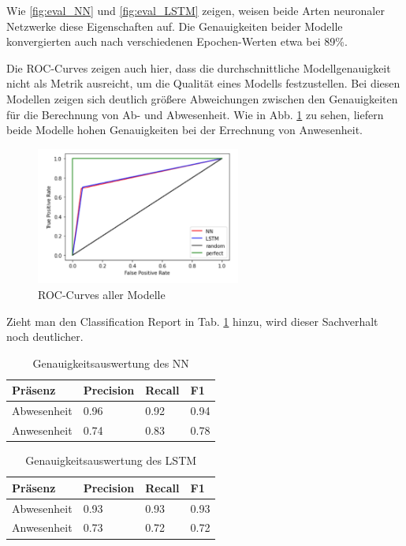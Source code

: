 Wie \ref{fig:eval_NN} und \ref{fig:eval_LSTM} zeigen, weisen beide Arten neuronaler Netzwerke diese Eigenschaften auf. Die Genauigkeiten beider Modelle
konvergierten auch nach verschiedenen Epochen-Werten etwa bei 89\%.

\newpage
Die ROC-Curves zeigen auch hier, dass die durchschnittliche Modellgenauigkeit nicht als Metrik ausreicht, um
die Qualität eines Modells festzustellen. Bei diesen Modellen zeigen sich deutlich größere Abweichungen zwischen
den Genauigkeiten für die Berechnung von Ab- und Abwesenheit. Wie in Abb. \ref{fig:Roc_nn} zu sehen, liefern
beide Modelle hohen Genauigkeiten bei der Errechnung von Anwesenheit.

\begin{figure}[!h]
    \centering
    \includegraphics[width=0.6\textwidth]{pic/roc_nn.png}
    \caption{ROC-Curves aller Modelle}
    \label{fig:Roc_nn}
\end{figure}

Zieht man den Classification Report in Tab. \ref{tab:nn} hinzu, wird dieser Sachverhalt noch deutlicher.


\begin{table}[h]
    \centering
    \caption{Genauigkeitsauswertung des NN}
    \begin{tabular}{|p{2.5cm}||p{1.8cm}|p{1.5cm}|p{1.5cm}|}
        \hline
        \hfill Präsenz&\hfill Precision &\hfill Recall &\hfill F1\\
        \hline
        \hline
        \hfill Abwesenheit&\hfill 0.96&\hfill 0.92&\hfill 0.94\\
        \hfill Anwesenheit&\hfill 0.74&\hfill 0.83&\hfill 0.78\\
        \hline
    \end{tabular}          
    \label{tab:nn}
\end{table}
\begin{table}[h]
    \centering
    \caption{Genauigkeitsauswertung des LSTM}
    \begin{tabular}{|p{2.5cm}||p{1.8cm}|p{1.5cm}|p{1.5cm}|}
        \hline
        \hfill Präsenz&\hfill Precision &\hfill Recall &\hfill F1\\
        \hline
        \hline
        \hfill Abwesenheit&\hfill 0.93&\hfill 0.93&\hfill 0.93\\
        \hfill Anwesenheit&\hfill 0.73&\hfill 0.72&\hfill 0.72\\
        \hline
    \end{tabular}          
    \label{tab:LSTM}
\end{table}


